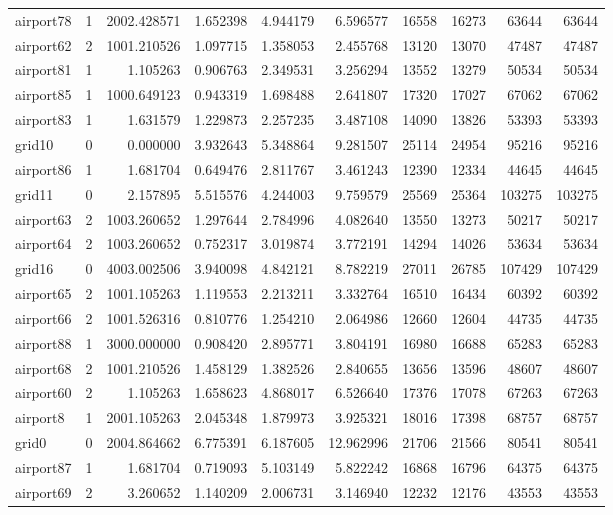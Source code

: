 \begin{longtable}{|l|r|r|r|r|r|r|r|r|r|}
airport78 & 1 & 2002.428571 & 1.652398 & 4.944179 & 6.596577 & 16558 & 16273 & 63644 & 63644 \\
airport62 & 2 & 1001.210526 & 1.097715 & 1.358053 & 2.455768 & 13120 & 13070 & 47487 & 47487 \\
airport81 & 1 & 1.105263 & 0.906763 & 2.349531 & 3.256294 & 13552 & 13279 & 50534 & 50534 \\
airport85 & 1 & 1000.649123 & 0.943319 & 1.698488 & 2.641807 & 17320 & 17027 & 67062 & 67062 \\
airport83 & 1 & 1.631579 & 1.229873 & 2.257235 & 3.487108 & 14090 & 13826 & 53393 & 53393 \\
grid10 & 0 & 0.000000 & 3.932643 & 5.348864 & 9.281507 & 25114 & 24954 & 95216 & 95216 \\
airport86 & 1 & 1.681704 & 0.649476 & 2.811767 & 3.461243 & 12390 & 12334 & 44645 & 44645 \\
grid11 & 0 & 2.157895 & 5.515576 & 4.244003 & 9.759579 & 25569 & 25364 & 103275 & 103275 \\
airport63 & 2 & 1003.260652 & 1.297644 & 2.784996 & 4.082640 & 13550 & 13273 & 50217 & 50217 \\
airport64 & 2 & 1003.260652 & 0.752317 & 3.019874 & 3.772191 & 14294 & 14026 & 53634 & 53634 \\
grid16 & 0 & 4003.002506 & 3.940098 & 4.842121 & 8.782219 & 27011 & 26785 & 107429 & 107429 \\
airport65 & 2 & 1001.105263 & 1.119553 & 2.213211 & 3.332764 & 16510 & 16434 & 60392 & 60392 \\
airport66 & 2 & 1001.526316 & 0.810776 & 1.254210 & 2.064986 & 12660 & 12604 & 44735 & 44735 \\
airport88 & 1 & 3000.000000 & 0.908420 & 2.895771 & 3.804191 & 16980 & 16688 & 65283 & 65283 \\
airport68 & 2 & 1001.210526 & 1.458129 & 1.382526 & 2.840655 & 13656 & 13596 & 48607 & 48607 \\
airport60 & 2 & 1.105263 & 1.658623 & 4.868017 & 6.526640 & 17376 & 17078 & 67263 & 67263 \\
airport8 & 1 & 2001.105263 & 2.045348 & 1.879973 & 3.925321 & 18016 & 17398 & 68757 & 68757 \\
grid0 & 0 & 2004.864662 & 6.775391 & 6.187605 & 12.962996 & 21706 & 21566 & 80541 & 80541 \\
airport87 & 1 & 1.681704 & 0.719093 & 5.103149 & 5.822242 & 16868 & 16796 & 64375 & 64375 \\
airport69 & 2 & 3.260652 & 1.140209 & 2.006731 & 3.146940 & 12232 & 12176 & 43553 & 43553 \\

\end{longtable}
